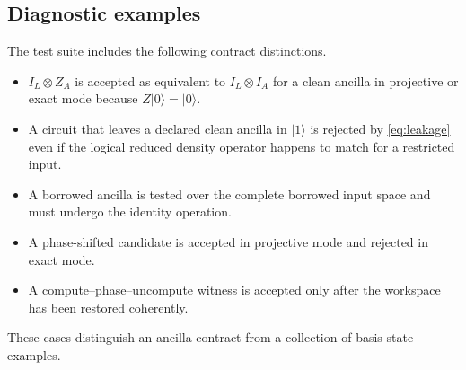 \subsection{Diagnostic examples}

The test suite includes the following contract distinctions.
\begin{itemize}
\item $I_L\otimes Z_A$ is accepted as equivalent to $I_L\otimes I_A$ for a clean ancilla in projective or exact mode because $Z\lvert0\rangle=\lvert0\rangle$.
\item A circuit that leaves a declared clean ancilla in $\lvert1\rangle$ is rejected by \eqref{eq:leakage} even if the logical reduced density operator happens to match for a restricted input.
\item A borrowed ancilla is tested over the complete borrowed input space and must undergo the identity operation.
\item A phase-shifted candidate is accepted in projective mode and rejected in exact mode.
\item A compute--phase--uncompute witness is accepted only after the workspace has been restored coherently.
\end{itemize}
These cases distinguish an ancilla contract from a collection of basis-state examples.
